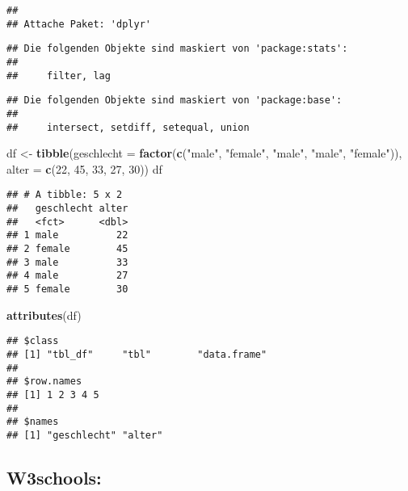 \documentclass[
]{article}
\newenvironment{Shaded}{\begin{snugshade}}{\end{snugshade}}
\newcommand{\AttributeTok}[1]{\textcolor[rgb]{0.13,0.29,0.53}{#1}}
\newcommand{\DecValTok}[1]{\textcolor[rgb]{0.00,0.00,0.81}{#1}}
\newcommand{\FunctionTok}[1]{\textcolor[rgb]{0.13,0.29,0.53}{\textbf{#1}}}
\newcommand{\NormalTok}[1]{#1}
\newcommand{\OtherTok}[1]{\textcolor[rgb]{0.56,0.35,0.01}{#1}}
\newcommand{\StringTok}[1]{\textcolor[rgb]{0.31,0.60,0.02}{#1}}
\begin{document}
\begin{verbatim}
## 
## Attache Paket: 'dplyr'
\end{verbatim}

\begin{verbatim}
## Die folgenden Objekte sind maskiert von 'package:stats':
## 
##     filter, lag
\end{verbatim}

\begin{verbatim}
## Die folgenden Objekte sind maskiert von 'package:base':
## 
##     intersect, setdiff, setequal, union
\end{verbatim}

\begin{Shaded}
\begin{Highlighting}[]
\NormalTok{df }\OtherTok{\textless{}{-}} \FunctionTok{tibble}\NormalTok{(}\AttributeTok{geschlecht =} \FunctionTok{factor}\NormalTok{(}\FunctionTok{c}\NormalTok{(}\StringTok{"male"}\NormalTok{, }\StringTok{"female"}\NormalTok{,}
                                   \StringTok{"male"}\NormalTok{, }\StringTok{"male"}\NormalTok{,}
                                   \StringTok{"female"}\NormalTok{)),}
             \AttributeTok{alter =} \FunctionTok{c}\NormalTok{(}\DecValTok{22}\NormalTok{, }\DecValTok{45}\NormalTok{, }\DecValTok{33}\NormalTok{, }\DecValTok{27}\NormalTok{, }\DecValTok{30}\NormalTok{))}
\NormalTok{df}
\end{Highlighting}
\end{Shaded}

\begin{verbatim}
## # A tibble: 5 x 2
##   geschlecht alter
##   <fct>      <dbl>
## 1 male          22
## 2 female        45
## 3 male          33
## 4 male          27
## 5 female        30
\end{verbatim}

\begin{Shaded}
\begin{Highlighting}[]
\FunctionTok{attributes}\NormalTok{(df)}
\end{Highlighting}
\end{Shaded}

\begin{verbatim}
## $class
## [1] "tbl_df"     "tbl"        "data.frame"
## 
## $row.names
## [1] 1 2 3 4 5
## 
## $names
## [1] "geschlecht" "alter"
\end{verbatim}

\hypertarget{w3schools}{%
\subsection{W3schools:}\label{w3schools}}
\end{document}
